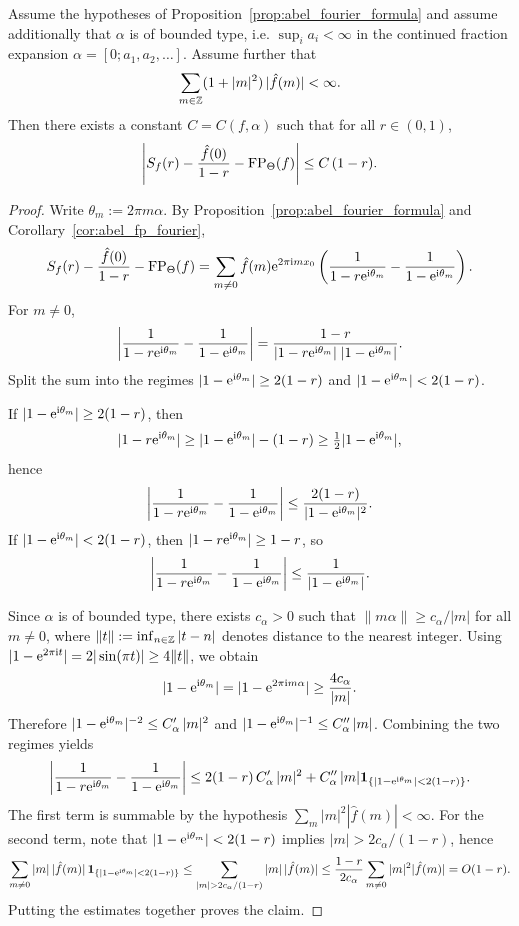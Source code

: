 \begin{proposition}
\label{prop:abel_fp_error}
Assume the hypotheses of Proposition~\ref{prop:abel_fourier_formula} and assume additionally that $\alpha$ is of bounded type, i.e. $\sup_i a_i<\infty$ in the continued fraction expansion $\alpha=[0;a_1,a_2,\dots]$.
Assume further that
$$
\sum_{m\in\mathbb{Z}}(1+|m|^2)\,|\hat f(m)|<\infty.
$$
Then there exists a constant $C=C(f,\alpha)$ such that for all $r\in(0,1)$,
$$
\left|S_f(r)-\frac{\hat f(0)}{1-r}-\mathrm{FP}_\Theta(f)\right|\le C\,(1-r).
$$
\end{proposition}

\begin{proof}
Write $\theta_m:=2\pi m\alpha$.
By Proposition~\ref{prop:abel_fourier_formula} and Corollary~\ref{cor:abel_fp_fourier},
$$
S_f(r)-\frac{\hat f(0)}{1-r}-\mathrm{FP}_\Theta(f)
=\sum_{m\ne 0}\hat f(m)\mathrm{e}^{2\pi\mathrm{i} m x_0}
\left(\frac{1}{1-r\mathrm{e}^{\mathrm{i}\theta_m}}-\frac{1}{1-\mathrm{e}^{\mathrm{i}\theta_m}}\right).
$$
For $m\ne 0$,
$$
\left|\frac{1}{1-r\mathrm{e}^{\mathrm{i}\theta_m}}-\frac{1}{1-\mathrm{e}^{\mathrm{i}\theta_m}}\right|
=\frac{1-r}{|1-r\mathrm{e}^{\mathrm{i}\theta_m}|\;|1-\mathrm{e}^{\mathrm{i}\theta_m}|}.
$$
Split the sum into the regimes $|1-\mathrm{e}^{\mathrm{i}\theta_m}|\ge 2(1-r)$ and $|1-\mathrm{e}^{\mathrm{i}\theta_m}|<2(1-r)$.

If $|1-\mathrm{e}^{\mathrm{i}\theta_m}|\ge 2(1-r)$, then
$$
|1-r\mathrm{e}^{\mathrm{i}\theta_m}|\ge |1-\mathrm{e}^{\mathrm{i}\theta_m}|-(1-r)\ge \tfrac12|1-\mathrm{e}^{\mathrm{i}\theta_m}|,
$$
hence
$$
\left|\frac{1}{1-r\mathrm{e}^{\mathrm{i}\theta_m}}-\frac{1}{1-\mathrm{e}^{\mathrm{i}\theta_m}}\right|
\le \frac{2(1-r)}{|1-\mathrm{e}^{\mathrm{i}\theta_m}|^2}.
$$
If $|1-\mathrm{e}^{\mathrm{i}\theta_m}|<2(1-r)$, then $|1-r\mathrm{e}^{\mathrm{i}\theta_m}|\ge 1-r$, so
$$
\left|\frac{1}{1-r\mathrm{e}^{\mathrm{i}\theta_m}}-\frac{1}{1-\mathrm{e}^{\mathrm{i}\theta_m}}\right|
\le \frac{1}{|1-\mathrm{e}^{\mathrm{i}\theta_m}|}.
$$

Since $\alpha$ is of bounded type, there exists $c_\alpha>0$ such that $\|m\alpha\|\ge c_\alpha/|m|$ for all $m\ne 0$, where $\|t\|:=\inf_{n\in\mathbb{Z}}|t-n|$ denotes distance to the nearest integer.
Using $|1-\mathrm{e}^{2\pi\mathrm{i} t}|=2|\sin(\pi t)|\ge 4\|t\|$, we obtain
$$
|1-\mathrm{e}^{\mathrm{i}\theta_m}|=|1-\mathrm{e}^{2\pi\mathrm{i} m\alpha}|\ge \frac{4c_\alpha}{|m|}.
$$
Therefore $|1-\mathrm{e}^{\mathrm{i}\theta_m}|^{-2}\le C'_\alpha\,|m|^2$ and $|1-\mathrm{e}^{\mathrm{i}\theta_m}|^{-1}\le C''_\alpha\,|m|$.
Combining the two regimes yields
$$
\left|\frac{1}{1-r\mathrm{e}^{\mathrm{i}\theta_m}}-\frac{1}{1-\mathrm{e}^{\mathrm{i}\theta_m}}\right|
\le 2(1-r)\,C'_\alpha\,|m|^2 + C''_\alpha\,|m|\mathbf{1}_{\{|1-\mathrm{e}^{\mathrm{i}\theta_m}|<2(1-r)\}}.
$$
The first term is summable by the hypothesis $\sum_m|m|^2|\hat f(m)|<\infty$.
For the second term, note that $|1-\mathrm{e}^{\mathrm{i}\theta_m}|<2(1-r)$ implies $|m|>2c_\alpha/(1-r)$, hence
$$
\sum_{m\ne 0}|m|\,|\hat f(m)|\,\ind_{\{|1-\e^{\iu\theta_m}|<2(1-r)\}}
\le \sum_{|m|>2c_\alpha/(1-r)} |m|\,|\hat f(m)|
\le \frac{1-r}{2c_\alpha}\sum_{m\ne 0}|m|^2|\hat f(m)|
=O(1-r).
$$
Putting the estimates together proves the claim.
\end{proof}

